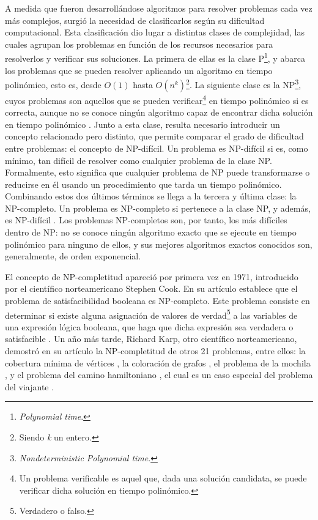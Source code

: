 A medida que fueron desarrollándose algoritmos para resolver problemas cada vez más complejos, surgió la necesidad de 
clasificarlos según su dificultad computacional. Esta clasificación dio lugar a distintas clases de complejidad, las 
cuales agrupan los problemas en función de los recursos necesarios para resolverlos y verificar sus soluciones. La primera 
de ellas es la clase P\footnote{\textit{Polynomial time}.}, y abarca los problemas que se pueden resolver aplicando un
algoritmo en tiempo polinómico, esto es, desde $O(1)$ hasta $O(n^k)$\footnote{Siendo \textit{k} un entero.}. La siguiente 
clase es la NP\footnote{\textit{Nondeterministic Polynomial time}.}, cuyos problemas son aquellos que se pueden 
verificar\footnote{Un problema verificable es aquel que, dada una solución candidata, se puede verificar dicha solución en 
tiempo polinómico.} en tiempo polinómico si es correcta, aunque no se conoce ningún algoritmo capaz de encontrar dicha 
solución en tiempo polinómico \cite{cormen2009}. Junto a esta clase, resulta necesario introducir un concepto relacionado pero
distinto, que permite comparar el grado de dificultad entre problemas: el concepto de NP-difícil. Un problema es NP-difícil si 
es, como mínimo, tan difícil de resolver como cualquier problema de la clase NP. Formalmente, esto significa que cualquier 
problema de NP puede transformarse o reducirse en él usando un procedimiento que tarda un tiempo polinómico. Combinando estos 
dos últimos términos se llega a la tercera y última clase: la NP-completo. Un problema es NP-completo si pertenece a la clase NP,
y además, es NP-difícil \cite{cormen2009}. Los problemas NP-completos son, por tanto, los más difíciles dentro de NP: no se 
conoce ningún algoritmo exacto que se ejecute en tiempo polinómico para ninguno de ellos, y sus mejores algoritmos exactos 
conocidos son, generalmente, de orden exponencial.

El concepto de NP-completitud apareció por primera vez en 1971, introducido por el científico norteamericano Stephen Cook. En su 
artículo \cite{cook1971} establece que el problema de satisfacibilidad booleana es NP-completo. Este problema consiste en 
determinar si existe alguna asignación de valores de verdad\footnote{Verdadero o falso.} a las variables de una expresión 
lógica booleana, que haga que dicha expresión sea verdadera o satisfacible \cite{academialab}. Un año más tarde, Richard 
Karp, otro científico norteamericano, demostró en su artículo \cite{karp1972} la NP-completitud de otros 21 problemas, entre 
ellos: la cobertura mínima de vértices \cite{vertices}, la coloración de grafos \cite{khanna2000}, el problema de la mochila
\cite{mahapatra2011}, y el problema del camino hamiltoniano \cite{sipser2013}, el cual es un caso especial del problema 
del viajante \cite{johnson2012}.

